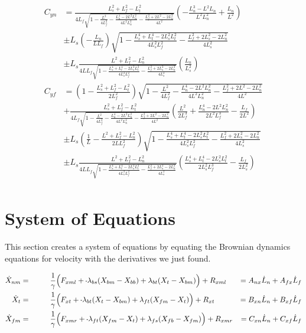\documentclass[11pt, landscape]{article}
\newcommand{\mn}{\scalebox{0.7}[1.0]{-}}
\begin{document}
\begin{align}
  C_{yn} &= \frac{L_{s}^2+L_f^2-L_{t}^2}{4L_f\sqrt{1 - \frac{L^2}{4L_f^2} - \frac{L_n^4 - 2L^2L_n^2}{4L^2L^2_{n}} - \frac{L_f^2 + 2L^2 - 2L_n^2}{4L^2}}}\left(-\frac{L_n^3 - L^2L_n}{L^2L^2_{n}} + \frac{L_n}{L^2}\right)\\
    &\pm L_s\left(-\frac{L_n}{LL_f}\right)\sqrt{1 - \frac{L_s^4 + L_t^4 - 2L_s^2L_t^2}{4L_s^2L_f^2} - \frac{L_f^2 + 2L_s^2 - 2L_n^2}{4L_s^2}}\\
    &\pm L_s\frac{L^2+L_f^2-L_n^2}{4LL_f\sqrt{1 - \frac{L_s^4 + L_t^4 - 2L_s^2L_t^2}{4L_s^2L_f^2} - \frac{L_f^2 + 2L_s^2 - 2L_n^2}{4L_s^2}}}\left(\frac{L_n}{L_s^2}\right)\\
  C_{yf} &= \left(1 - \frac{L_{s}^2+L_f^2-L_{t}^2}{2L_f^2}\right)\sqrt{1 - \frac{L^2}{4L_f^2} - \frac{L_n^4 - 2L^2L_n^2}{4L^2L^2_{n}} - \frac{L_f^2 + 2L^2 - 2L_n^2}{4L^2}}\\
    &+ \frac{L_{s}^2+L_f^2-L_{t}^2}{4L_f\sqrt{1 - \frac{L^2}{4L_f^2} - \frac{L_n^4 - 2L^2L_n^2}{4L^2L^2_{n}} - \frac{L_f^2 + 2L^2 - 2L_n^2}{4L^2}}}\left(\frac{L^2}{2L_f^3} + \frac{L_n^4 - 2L^2L_n^2}{2L^2L_f^3} - \frac{L_f}{2L^2}\right)\\
    &\pm L_s\left(\frac{1}{L} - \frac{L^2+L_f^2-L_n^2}{2LL_f^2}\right)\sqrt{1 - \frac{L_s^4 + L_t^4 - 2L_s^2L_t^2}{4L_s^2L_f^2} - \frac{L_f^2 + 2L_s^2 - 2L_n^2}{4L_s^2}}\\
    &\pm L_s\frac{L^2+L_f^2-L_n^2}{4LL_f\sqrt{1 - \frac{L_s^4 + L_t^4 - 2L_s^2L_t^2}{4L_s^2L_f^2} - \frac{L_f^2 + 2L_s^2 - 2L_n^2}{4L_s^2}}}\left(\frac{L_s^4 + L_t^4 - 2L_s^2L_t^2}{2L_s^2L_f^3} - \frac{L_f}{2L_s^2}\right)\\
\end{align}

\section{System of Equations}
This section creates a system of equations by equating the Brownian dynamics equations for velocity with the derivatives we just found.

\begin{align}  
  \dot{X}_{nm} = \hspace{1cm}& \frac{1}{\gamma} \Big(F_{xml} + \mn \lambda_{bs}(X_{bm} - X_{bb}) + \lambda_{bt}(X_{t } - X_{bm}) \Big) + R_{xml}  &= A_{nx}\dot{L}_n + A_{fx}\dot{L}_f\\
  \dot{X}_{t } = \hspace{1cm}& \frac{1}{\gamma} \Big(F_{xt } + \mn \lambda_{bt}(X_{t } - X_{bm}) + \lambda_{ft}(X_{fm} - X_{t }) \Big) + R_{xt } &= B_{xn}\dot{L}_n + B_{xf}\dot{L}_f\\
  \dot{X}_{fm} = \hspace{1cm}& \frac{1}{\gamma} \Big(F_{xmr} + \mn \lambda_{ft}(X_{fm} - X_{t }) + \lambda_{fs}(X_{fb} - X_{fm}) \Big) + R_{xmr} &= C_{xn}\dot{L}_n + C_{xf}\dot{L}_f
\end{align}
\end{document}
